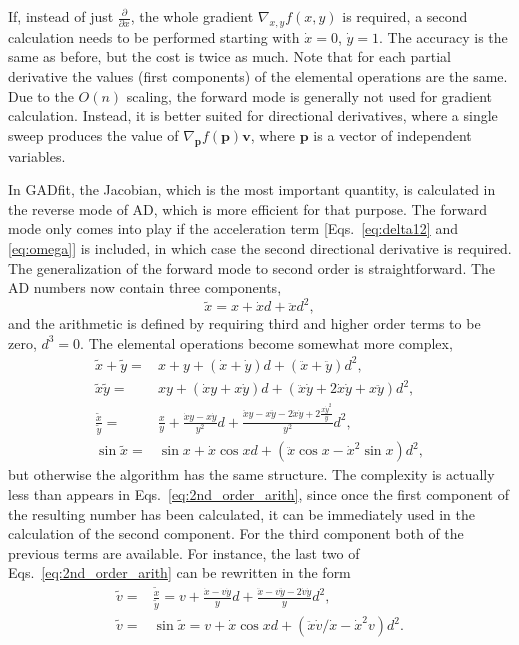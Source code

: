 \documentclass{article}
\begin{document}
If, instead of just $\frac{\partial}{\partial x}$, the whole gradient
$\nabla_{x,y}f(x,y)$ is required, a second calculation needs to be
performed starting with $\dot x = 0$, $\dot y = 1$. The accuracy is
the same as before, but the cost is twice as much. Note that for each
partial derivative the values (first components) of the elemental
operations are the same. Due to the $O(n)$ scaling, the forward mode
is generally not used for gradient calculation. Instead, it is better
suited for directional derivatives, where a single sweep produces the
value of $\nabla_{\bm p}f(\bm p)\bm v$, where $\bm p$ is a vector of
independent variables.

In GADfit, the Jacobian, which is the most important quantity, is
calculated in the reverse mode of AD, which is more efficient for that
purpose. The forward mode only comes into play if the acceleration
term [Eqs.~\eqref{eq:delta12} and \eqref{eq:omega}] is included, in
which case the second directional derivative is required. The
generalization of the forward mode to second order is
straightforward. The AD numbers now contain three components,
\begin{equation}
  \label{eq:adcomplex}
  \tilde x = x + \dot x d + \ddot x d^2,
\end{equation}
and the arithmetic is defined by requiring third and higher order
terms to be zero, $d^3 = 0$. The elemental operations become somewhat
more complex,
\begin{equation}
  \label{eq:2nd_order_arith}
  \begin{split}
    \tilde x + \tilde y =& x + y + (\dot x + \dot y)d + (\ddot x +
    \ddot y)d^2, \\
    \tilde x\tilde y =& xy + (\dot xy + x\dot y)d +
    (\ddot x\dot y + 2\dot x\dot y + x\ddot y)d^2, \\
    \frac{\tilde x}{\tilde y} =& \frac{x}{y} + \frac{\dot xy-x\dot
      y}{y^2}d + \frac{\ddot xy-x\ddot y-2\dot x\dot y+2\frac{x\dot
        y^2}{y}}{y^2}d^2, \\
    \sin\tilde x =& \sin x + \dot x\cos x d + (\ddot x\cos x - \dot
    x^2\sin x) d^2,
  \end{split}
\end{equation}
but otherwise the algorithm has the same structure. The complexity is
actually less than appears in Eqs.~\eqref{eq:2nd_order_arith}, since
once the first component of the resulting number has been calculated,
it can be immediately used in the calculation of the second
component. For the third component both of the previous terms are
available. For instance, the last two of
Eqs.~\eqref{eq:2nd_order_arith} can be rewritten in the form
\begin{equation}
  \label{eq:2nd_order_arith_compact}
  \begin{split}
    \tilde v =& \frac{\tilde x}{\tilde y} = v + \frac{\dot x-v\dot
      y}{y}d + \frac{\ddot x-v\ddot y-2\dot v\dot y}{y}d^2, \\
    \tilde v =& \sin\tilde x = v + \dot x\cos x d + (\ddot x\dot
    v/\dot x - \dot x^2v) d^2.
  \end{split}
\end{equation}
\end{document}
